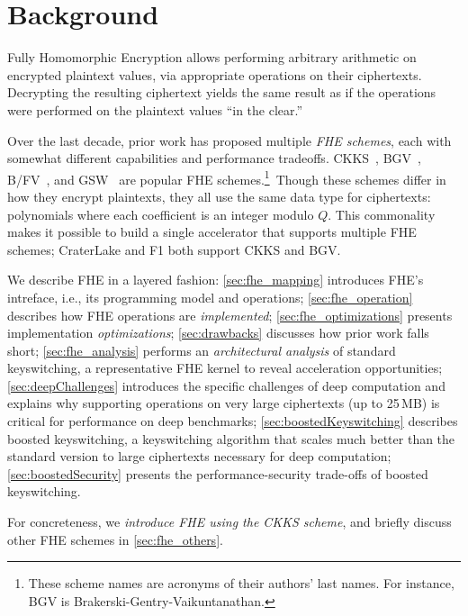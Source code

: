 \chapter{Background}\label{sec:background}

Fully Homomorphic Encryption allows performing arbitrary
arithmetic on encrypted plaintext values, via appropriate operations
on their ciphertexts. Decrypting the resulting ciphertext yields the
same result as if the operations were performed on the plaintext
values ``in the clear.''

Over the last decade, prior work has proposed multiple \emph{FHE schemes}, each
with somewhat different capabilities and performance tradeoffs.
CKKS~\cite{cheon:ictaci17:homomorphic}, BGV~\cite{brakerski:toct14:leveled},
B/FV~\cite{brakerski:crypto12:fully,fan:iacr12:somewhat}, and
GSW~\cite{gentry:crypto13:homomorphic} are popular FHE schemes.\footnote{These
scheme names are acronyms of their authors' last names. For instance, BGV is
Brakerski-Gentry-Vaikuntanathan.}~Though these schemes differ in how they
encrypt plaintexts, they all use the same data type for ciphertexts:
polynomials where each coefficient is an integer modulo $Q$. This commonality
makes it possible to build a single accelerator that supports multiple FHE
schemes; CraterLake and F1 both support CKKS and BGV.

We describe FHE in a layered fashion: \autoref{sec:fhe_mapping} introduces
FHE's intreface, i.e., its programming model and operations;
\autoref{sec:fhe_operation} describes how FHE operations are
\emph{implemented}; \autoref{sec:fhe_optimizations} presents implementation
\emph{optimizations}; \autoref{sec:drawbacks} discusses how prior work falls
short; \autoref{sec:fhe_analysis} performs an \emph{architectural analysis} of
standard keyswitching, a representative FHE kernel to reveal acceleration
opportunities; \autoref{sec:deepChallenges} introduces the specific challenges
of deep computation and explains why supporting operations on very large
ciphertexts (up to 25\,MB) is critical for performance on deep benchmarks;
\autoref{sec:boostedKeyswitching} describes boosted keyswitching, a
keyswitching algorithm that scales much better than the standard version to
large ciphertexts necessary for deep computation; \autoref{sec:boostedSecurity}
presents the performance-security trade-offs of boosted keyswitching.

For concreteness, we \emph{introduce FHE using the CKKS scheme}, and briefly
discuss other FHE schemes in \autoref{sec:fhe_others}.

